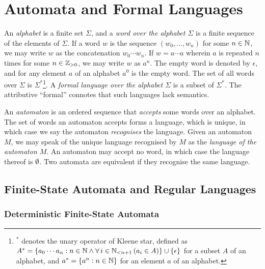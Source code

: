 


\usepackage{tikz}
\usetikzlibrary{automata,decorations.markings}
\newcommand*{\pt}{5mm}
\newcommand*{\lemautorefname}{Lemma}
\newcommand*{\thmautorefname}{Theorem}


\section{Automata and Formal Languages}

An \emph{alphabet} is a finite set \(\Sigma\), and a \emph{word over the alphabet \(\Sigma\)} is a finite sequence of
the elements of \(\Sigma\). If a word \(w\) is the sequence \((w_0, \ldots, w_n)\) for some \(n \in \setnat\), we may
write \(w\) as the concatenation \(w_0 \cdots w_n\). If \(w = a \cdots a\) wherein \(a\) is repeated \(n\) times for
some \(n \in \posint\), we may write \(w\) as \(a^n\). The empty word is denoted by \(\epsilon\), and for any element
\(a\) of an alphabet \(a^0\) is the empty word. The set of all words over \(\Sigma\) is \(\Sigma^*\)\footnote{\(^*\)
denotes the unary operator of Kleene star, defined as \(A^* = \set{a_0 \cdots a_n : n \in \setnat
\land \forall \, i \in \Nln[n + 1] \, (a_i \in A)} \cup \set{\epsilon}\) for a subset \(A\) of an alphabet, and
\(a^* = \set{a^n : n \in \setnat}\) for an element \(a\) of an alphabet.}. A \emph{formal language over the alphabet
\(\Sigma\)} is a subset of \(\Sigma^*\).  The attributive ``formal'' connotes that such languages lack semantics.

An \emph{automaton} is an ordered sequence that \emph{accepts} some words over an alphabet. The set of words an
automaton accepts forms a language, which is unique, in which case we say the automaton \emph{recognises} the language.
Given an automaton \(M\), we may speak of the unique language recognised by \(M\) as the \emph{language of the automaton
\(M\)}. An automaton may accept no word, in which case the language thereof is \(\nset\). Two automata are equivalent if
they recognise the same language.

\subsection{Finite-State Automata and Regular Languages}

\subsubsection{Deterministic Finite-State Automata}

